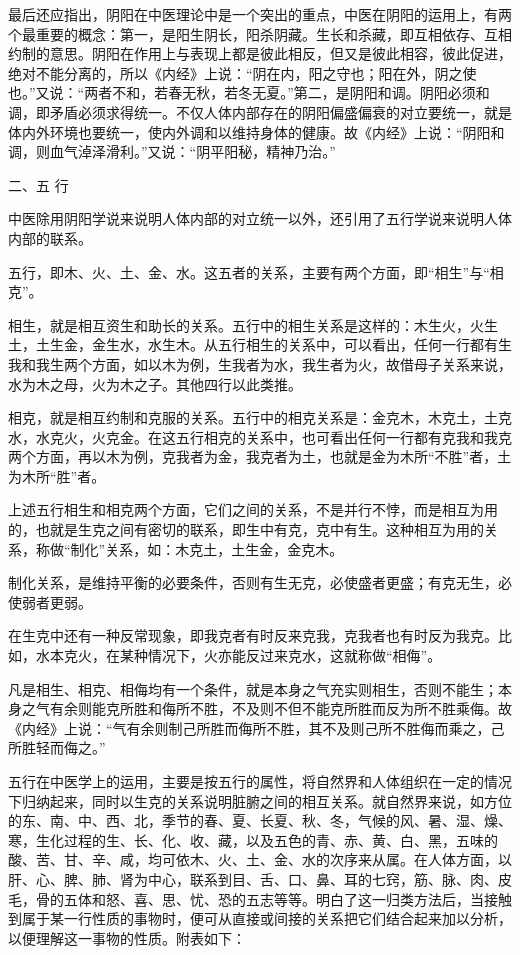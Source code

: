 \documentclass[a4paper,12pt,UTF8,twoside]{ctexbook}
\begin{document}
最后还应指出，阴阳在中医理论中是一个突出的重点，中医在阴阳的运用上，有两个最重要的概念：第一，是阳生阴长，阳杀阴藏。生长和杀藏，即互相依存、互相约制的意思。阴阳在作用上与表现上都是彼此相反，但又是彼此相容，彼此促进，绝对不能分离的，所以《内经》上说：“阴在内，阳之守也；阳在外，阴之使也。”又说：“两者不和，若春无秋，若冬无夏。”第二，是阴阳和调。阴阳必须和调，即矛盾必须求得统一。不仅人体内部存在的阴阳偏盛偏衰的对立要统一，就是体内外环境也要统一，使内外调和以维持身体的健康。故《内经》上说：“阴阳和调，则血气淖泽滑利。”又说：“阴平阳秘，精神乃治。”

二、五 行

中医除用阴阳学说来说明人体内部的对立统一以外，还引用了五行学说来说明人体内部的联系。

五行，即木、火、土、金、水。这五者的关系，主要有两个方面，即“相生”与“相克”。

相生，就是相互资生和助长的关系。五行中的相生关系是这样的：木生火，火生土，土生金，金生水，水生木。从五行相生的关系中，可以看出，任何一行都有生我和我生两个方面，如以木为例，生我者为水，我生者为火，故借母子关系来说，水为木之母，火为木之子。其他四行以此类推。

相克，就是相互约制和克服的关系。五行中的相克关系是：金克木，木克土，土克水，水克火，火克金。在这五行相克的关系中，也可看出任何一行都有克我和我克两个方面，再以木为例，克我者为金，我克者为土，也就是金为木所“不胜”者，土为木所“胜”者。

上述五行相生和相克两个方面，它们之间的关系，不是并行不悖，而是相互为用的，也就是生克之间有密切的联系，即生中有克，克中有生。这种相互为用的关系，称做“制化”关系，如：木克土，土生金，金克木。

制化关系，是维持平衡的必要条件，否则有生无克，必使盛者更盛；有克无生，必使弱者更弱。

在生克中还有一种反常现象，即我克者有时反来克我，克我者也有时反为我克。比如，水本克火，在某种情况下，火亦能反过来克水，这就称做“相侮”。

凡是相生、相克、相侮均有一个条件，就是本身之气充实则相生，否则不能生；本身之气有余则能克所胜和侮所不胜，不及则不但不能克所胜而反为所不胜乘侮。故《内经》上说：“气有余则制己所胜而侮所不胜，其不及则己所不胜侮而乘之，己所胜轻而侮之。”

五行在中医学上的运用，主要是按五行的属性，将自然界和人体组织在一定的情况下归纳起来，同时以生克的关系说明脏腑之间的相互关系。就自然界来说，如方位的东、南、中、西、北，季节的春、夏、长夏、秋、冬，气候的风、暑、湿、燥、寒，生化过程的生、长、化、收、藏，以及五色的青、赤、黄、白、黑，五味的酸、苦、甘、辛、咸，均可依木、火、土、金、水的次序来从属。在人体方面，以肝、心、脾、肺、肾为中心，联系到目、舌、口、鼻、耳的七窍，筋、脉、肉、皮毛，骨的五体和怒、喜、思、忧、恐的五志等等。明白了这一归类方法后，当接触到属于某一行性质的事物时，便可从直接或间接的关系把它们结合起来加以分析，以便理解这一事物的性质。附表如下：
\end{document}
